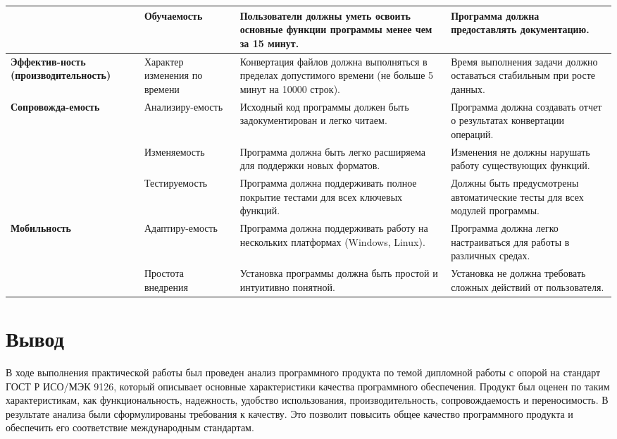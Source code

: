 \begin{longtable}{|p{3cm}|p{3cm}|p{5cm}|p{5cm}|}
	& Обучаемость
	& Пользователи должны уметь освоить основные функции программы
	менее чем за 15 минут.
	& Программа должна предоставлять документацию. \\ \hline

	\textbf{Эффектив-ность (производительность)}
	& Характер изменения по времени
	& Конвертация файлов должна выполняться
	в пределах допустимого времени (не больше 5 минут на 10000 строк).
	& Время выполнения задачи должно оставаться стабильным
	при росте данных. \\ \hline

	\textbf{Сопровожда-емость}
	& Анализиру-емость
	& Исходный код программы должен быть задокументирован и легко читаем.
	& Программа должна создавать отчет
	о результатах конвертации операций. \\ \hline

	& Изменяемость
	& Программа должна быть легко расширяема для поддержки новых форматов.
	& Изменения не должны нарушать работу существующих функций. \\ \hline

	& Тестируемость
	& Программа должна поддерживать полное покрытие тестами для всех ключевых функций.
	& Должны быть предусмотрены автоматические тесты для всех модулей программы. \\ \hline

	\textbf{Мобильность}
	& Адаптиру-емость
	& Программа должна поддерживать работу на нескольких платформах (Windows, Linux).
	& Программа должна легко настраиваться для работы в различных средах. \\ \hline

	& Простота внедрения
	& Установка программы должна быть простой и интуитивно понятной.
	& Установка не должна требовать сложных действий от пользователя. \\ \hline
\end{longtable}

\clearpage

\section*{\LARGE Вывод}

В ходе выполнения практической работы был проведен анализ
программного продукта по темой дипломной работы
с опорой на стандарт ГОСТ Р ИСО/МЭК 9126,
который описывает основные характеристики качества программного обеспечения.
Продукт был оценен по таким характеристикам, как
функциональность, надежность, удобство использования, производительность,
сопровождаемость и переносимость.
В результате анализа были сформулированы требования к качеству.
Это позволит повысить общее качество программного продукта
и обеспечить его соответствие международным стандартам.

